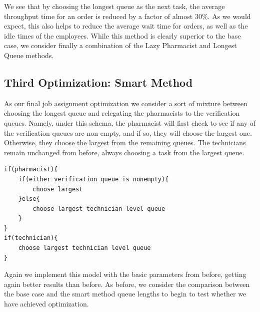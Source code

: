 \documentclass[10pt]{report}            %
\begin{document}
We see that by choosing the longest queue as the next task, the average throughput time for an order is reduced by a factor of almost $30\%$. As we would expect, this also helps to reduce the average wait time for orders, as well as the idle times of the employees.  While this method is clearly superior to the base case, we consider finally a combination of the Lazy Pharmacist and Longest Queue methods.
\subsection*{Third Optimization: Smart Method}
As our final job assignment optimization we consider a sort of mixture between choosing the longest queue and relegating the pharmacists to the verification queues. Namely, under this schema, the pharmacist will first check to see if any of the verification queues are non-empty, and if so, they will choose the largest one. Otherwise, they choose the largest from the remaining queues. The technicians remain unchanged from before, always choosing a task from the largest queue.
\begin{verbatim}
if(pharmacist){
    if(either verification queue is nonempty){
        choose largest
    }else{
        choose largest technician level queue
    }
}
if(technician){
    choose largest technician level queue
}
\end{verbatim}
Again we implement this model with the basic parameters from before, getting again better results than before. As before, we consider the comparison between the base case and the smart method queue lengths to begin to test whether we have achieved optimization.
\end{document}
